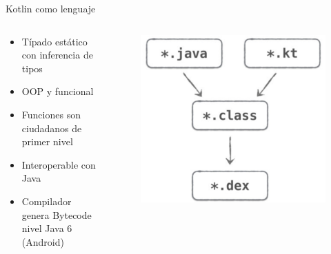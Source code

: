 \documentclass[aspectratio=169]{beamer}
\begin{document}
\begin{frame}[fragile]{Kotlin como lenguaje}
    \begin{columns}
        \begin{column}{0.5\textwidth}
            \begin{itemize}
                \item Típado estático con inferencia de tipos
                \item OOP y funcional
                \item Funciones son ciudadanos de primer nivel
                \item Interoperable con Java
                \item Compilador genera Bytecode nivel Java 6 (Android)
            \end{itemize}
        \end{column}
        \begin{column}{0.5\textwidth}  %
            \begin{figure}
                \centering
                \includegraphics[width=0.8\linewidth]{Images/compile}
            \end{figure}
        \end{column}
    \end{columns}
    
\end{frame}
\end{document}
